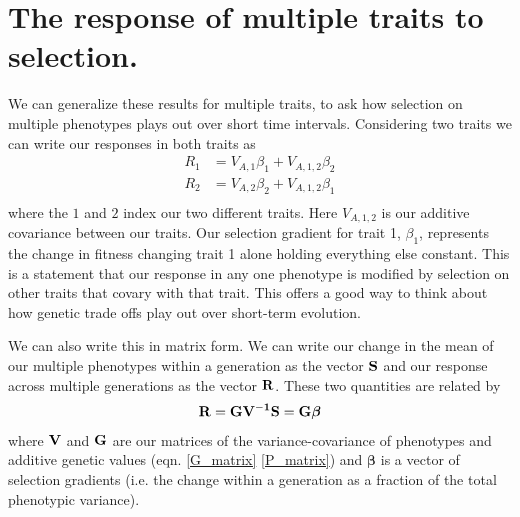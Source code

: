 \section{The response of multiple traits to selection.}
We can generalize these results for multiple traits, to ask how selection on
multiple phenotypes plays out over short time intervals. \cite{lande:79} Considering two traits we can write our responses in both traits as
\begin{eqnarray}
R_1 & = V_{A,1} \beta_1 + V_{A,1,2} \beta_2 \nonumber \\
R_2 & = V_{A,2} \beta_2 + V_{A,1,2} \beta_1  \nonumber \\
\end{eqnarray}
where the $1$ and $2$ index our two different traits. Here $V_{A,1,2}$ is our additive covariance between our traits. Our selection gradient for trait 1, $\beta_1$, represents the change in fitness changing trait 1 alone holding everything else constant. This is a statement that our response in any one phenotype is modified by selection on other traits that covary with that trait. This offers a good way to think about how genetic trade offs play out over short-term evolution.

We can also write this in matrix form. We can write
our change in the mean of our multiple phenotypes within a generation as the vector $\bf{S}$ and our response across multiple generations as
the vector $\bf{R}$. These two quantities are related by 
\begin{equation}
\bf{R} = \bf{G} \bf{V}^{-1} \bf{S} = \bf{G} \boldsymbol{ \beta}
\end{equation}
 where $\bf{V}$ and $\bf{G}$ are our matrices of the
 variance-covariance of phenotypes and additive genetic values
 (eqn. \eqref{G_matrix} \eqref{P_matrix}) and
 $\boldsymbol{\beta}$ is a vector of selection gradients (i.e. the change within a generation as a fraction of the total phenotypic variance). 

 
